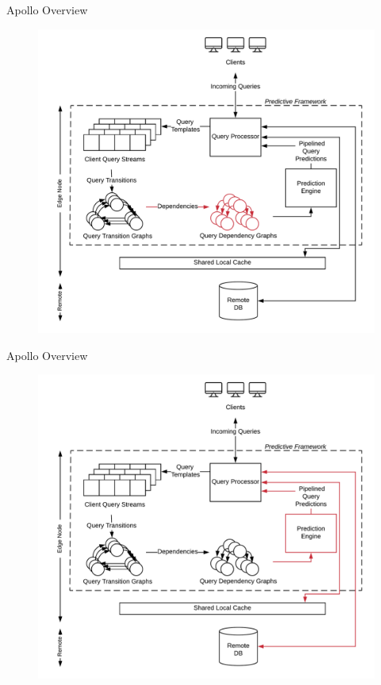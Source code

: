 \documentclass[10pt]{beamer}
\begin{document}
\begin{frame}[fragile]{Apollo Overview}
    \begin{figure}
        \hspace*{-1cm}
        \includegraphics[scale=0.13]{apollo_overview_4}
    \end{figure}
\end{frame}

\begin{frame}[fragile]{Apollo Overview}
    \begin{figure}
        \hspace*{-1cm}
        \includegraphics[scale=0.13]{apollo_overview_5}
    \end{figure}
\end{frame}
\end{document}
